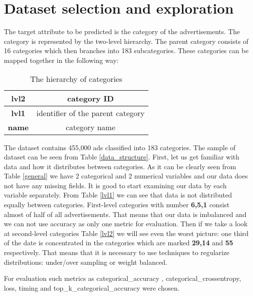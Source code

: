 \section{Dataset selection and exploration} \label{sect3_2}

The target attribute to be predicted is the category of the advertisements. The category is represented by the two-level hierarchy. The parent category consists of 16 categories which then branches into 183 subcategories. These categories can be mapped together in the following way:

\begin{table}[h]
	\centering
	\caption{The hierarchy of categories}
	\label{my-label}
	\begin{tabular}{|c|c|}
		\hline
		\textbf{lvl2}      & category ID     \\
		\hline
		\textbf{lvl1}	 		  & identifier of the parent category		 \\
		\hline
		\textbf{name}	 		  & category name		 \\
		\hline
	\end{tabular}
\end{table}

The dataset contains 455,000 ads classified into 183 categories. 
The sample of dataset can be seen from Table \ref{data_structure}.
First, let us get familiar with data and how it distributes between categories.
As it can be clearly seen from Table \ref{general} we have 2 categorical 
and 2 numerical variables and our data does not have any missing fields. 
It is good to start examining our data by each variable separately. 
From Table \ref{lvl1} we can see that data is not distributed equally between 
categories. First-level categories with number \textbf{6,5,1} consist almost of half 
of all advertisements. That means that our data is imbalanced and we can not 
use accuracy as only one metric for evaluation. 
Then if we take a look at second-level categories Table \ref{lvl2} we will see even the worst picture: one third of the date is concentrated in the categories which are marked \textbf{29,14} and \textbf{55} respectively. 
That means that it is necessary to use techniques to regularize distributions: under/over sampling or weight balanced.

For evaluation such metrics as categorical\_accuracy
, categorical\_crossentropy, loss, timing and top\_k\_categorical\_accuracy were chosen. 


